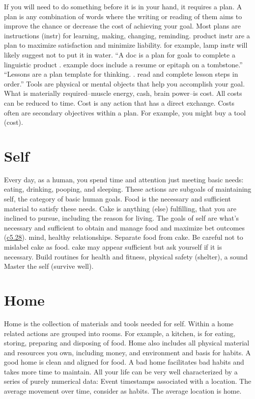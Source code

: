 \documentclass[
]{book}
\begin{document}
If you will need to do something before it is in your hand, it requires a plan.
A plan is any combination of words where the writing or reading of them aims to improve the chance or decrease the cost of achieving your goal.
Most plans are instructions (instr) for learning, making, changing, reminding. product instr are a plan to maximize satisfaction and minimize liability. for example, lamp instr will likely suggest not to put it in water.
``A doc is a plan for goals to complete a linguistic product . example docs include a resume or epitaph on a tombstone.''
``Lessons are a plan template for thinking. . read and complete lesson steps in order.''
Tools are physical or mental objects that help you accomplish your goal.
What is materially required--muscle energy, cash, brain power--is cost.
All costs can be reduced to time.
Cost is any action that has a direct exchange.
Costs often are secondary objectives within a plan.
For example, you might buy a tool (cost).

\section{Self}\label{self-self}

Every day, as a human, you spend time and attention just meeting basic needs: eating, drinking, pooping, and sleeping.
These actions are subgoals of maintaining self, the category of basic human goals.
Food is the necessary and sufficient material to satisfy these needs.
Cake is anything (else) fulfilling, that you are inclined to pursue, including the reason for living.
The goals of self are what's necessary and sufficient to obtain and manage food and maximize bet outcomes (\hyperref[bet]{c5.28}). mind, healthy relationships.
Separate food from cake.
Be careful not to mislabel cake as food. cake may appear sufficient but ask yourself if it is necessary.
Build routines for health and fitness, physical safety (shelter), a sound
Master the self (survive well).

\section{Home}\label{home}

Home is the collection of materials and tools needed for self.
Within a home related actions are grouped into rooms.
For example, a kitchen, is for eating, storing, preparing and disposing of food.
Home also includes all physical material and resources you own, including money, and environment and basis for habits.
A good home is clean and aligned for food.
A bad home facilitates bad habits and takes more time to maintain.
All your life can be very well characterized by a series of purely numerical data:
Event timestamps associated with a location.
The average movement over time, consider as habits.
The average location is home.
\end{document}
